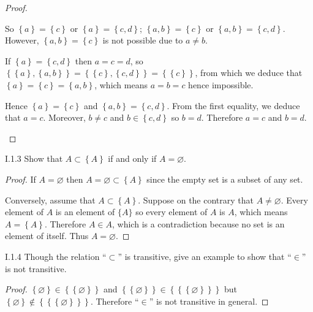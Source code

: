 \begin{proof}
\begin{enumerate}[label={\textbf{Case \arabic*.}},leftmargin=*]
		      So \( \left\{ a \right\} = \left\{ c \right\} \) or \( \left\{ a \right\} = \left\{ c, d \right\} \); \( \left\{ a, b \right\} = \left\{ c \right\} \) or \( \left\{ a, b \right\} = \left\{ c, d \right\} \). However, \( \left\{ a, b \right\} = \left\{ c \right\} \) is not possible due to \( a \ne b \).

		      If \( \left\{ a \right\} = \left\{ c, d \right\} \) then \( a = c = d \), so \( \left\{ \left\{ a \right\}, \left\{ a, b \right\} \right\} = \left\{ \left\{ c \right\}, \left\{ c, d \right\} \right\} = \left\{ \left\{ c \right\} \right\} \), from which we deduce that \( \left\{ a \right\} = \left\{ c \right\} = \left\{ a, b \right\} \), which means \( a = b = c \) hence impossible.

		      Hence \( \left\{ a \right\} = \left\{ c \right\} \) and \( \left\{ a, b \right\} = \left\{ c, d \right\} \). From the first equality, we deduce that \( a = c \). Moreover, \( b \ne c \) and \( b \in \left\{ c, d \right\} \) so \( b = d \). Therefore \( a = c \) and \( b = d \).
	\end{enumerate}
\end{proof}

\begin{problem}{I.1.3}
Show that \( A \subset \left\{ A \right\} \) if and only if \( A = \varnothing \).
\end{problem}

\begin{proof}
	If \( A = \varnothing \) then \( A = \varnothing \subset \left\{ A \right\} \) since the empty set is a subset of any set.

	Conversely, assume that \( A \subset \left\{ A \right\} \). Suppose on the contrary that \( A \ne \varnothing \). Every element of \( A \) is an element of \( \{ A \} \) so every element of \( A \) is \( A \), which means \( A = \left\{ A \right\} \). Therefore \( A \in A \), which is a contradiction because no set is an element of itself. Thus \( A = \varnothing \).
\end{proof}

\begin{problem}{I.1.4}
Though the relation ``\(\subset\)'' is transitive, give an example to show that ``\(\in\)'' is not transitive.
\end{problem}

\begin{proof}
	\( \left\{ \varnothing \right\} \in \left\{ \left\{ \varnothing \right\} \right\} \) and \( \left\{ \left\{ \varnothing \right\} \right\} \in \left\{ \left\{ \left\{ \varnothing \right\} \right\} \right\} \) but \( \left\{ \varnothing \right\} \notin \left\{ \left\{ \left\{ \varnothing \right\} \right\} \right\} \). Therefore ``\(\in\)'' is not transitive in general.
\end{proof}

